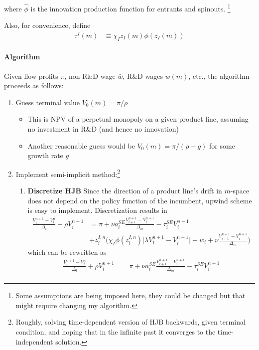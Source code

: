\documentclass[12pt,english]{article}
\theoremstyle{remark}
\begin{document}
where $\hat{\phi}$ is the innovation production function for entrants and spinouts. \footnote{Some assumptions are being imposed here, they could be changed but that might require changing my algorithm.} 

Also, for convenience, define
\begin{align*}
	\tau^I(m) &\equiv \chi_I z_I(m) \phi (z_I(m))
\end{align*}

\paragraph{Algorithm} Given flow profits $\pi$, non-R\&D wage $\bar{w}$, R\&D wages $w(m)$, etc., the algorithm proceeds as follows:

\begin{enumerate}
	\item Guess terminal value $V_0(m) = \pi / \rho$
	\begin{itemize}
		\item This is NPV of a perpetual monopoly on a given product line, assuming no investment in R\&D (and hence no innovation)
		\item Another reasonable guess would be $V_0(m) = \pi / (\rho - g)$ for some growth rate $g$
	\end{itemize}
	\item Implement semi-implicit method:\footnote{Roughly, solving time-dependent version of HJB backwards, given terminal condition, and hoping that in the infinite past it converges to the time-independent solution.}
	\begin{enumerate}
		\item \textbf{Discretize HJB} Since the direction of a product line's drift in $m$-space does not depend on the policy function of the incumbent, upwind scheme is easy to implement. Discretization results in
		\begin{align*}
			\frac{V_i^{n+1} - V_i^{n}}{\Delta_t} + \rho V_i^{n+1} &= \pi + \nu a_i^{SE} \frac{V_{i+1}^{n+1} - V_i^{n+1}}{\Delta_m} - \tau^{SE}_i V_i^{n+1} \\
			          &+ z^{I,n}_i \Big( \chi_I \phi(z^{I,n}_i) \big[ \lambda V^{n+1}_1 - V^{n+1}_i \big] - w_i + \nu \frac{V_{i+1}^{n+1} - V_i^{n+1}}{\Delta_m} \Big)
		\end{align*}
		which can be rewritten as 
		\begin{align*}
			\frac{V_i^{n+1} - V_i^{n}}{\Delta_t} + \rho V_i^{n+1} &= \pi + \nu a_i^{SE} \frac{V_{i+1}^{n+1} - V_i^{n+1}}{\Delta_m} - \tau^{SE}_i V_i^{n+1} \\

\end{align*}
\end{enumerate}
\end{enumerate}
\end{document}
